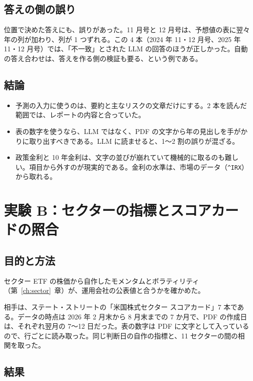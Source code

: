 \documentclass[xelatex,ja=standard,jafont=hiragino-pron,a4paper,10pt]{bxjsreport}
\newcommand{\code}[1]{\texttt{#1}}
\newcommand{\chapref}[1]{第~\ref{#1}~章}
\begin{document}
\section{答えの側の誤り}

位置で決めた答えにも、誤りがあった。11 月号と 12 月号は、予想値の表に翌々年の列が加わり、列が 1 つずれる。この 4 本（2024 年 11・12 月号、2025 年 11・12 月号）では、「不一致」とされた LLM の回答のほうが正しかった。自動の答え合わせは、答えを作る側の検証も要る、という例である。

\section{結論}

\begin{itemize}
\item 予測の入力に使うのは、要約と主なリスクの文章だけにする。2 本を読んだ範囲では、レポートの内容と合っていた。
\item 表の数字を使うなら、LLM ではなく、PDF の文字から年の見出しを手がかりに取り出すべきである。LLM に読ませると、1〜2 割の誤りが混ざる。
\item 政策金利と 10 年金利は、文字の並びが崩れていて機械的に取るのも難しい。項目から外すのが現実的である。金利の水準は、市場のデータ（\code{\textasciicircum IRX}）から取れる。
\end{itemize}

\chapter{実験 B：セクターの指標とスコアカードの照合}\label{ch:expB}

\section{目的と方法}

セクター ETF の株価から自作したモメンタムとボラティリティ（\chapref{ch:sector}）が、運用会社の公表値と合うかを確かめた。

相手は、ステート・ストリートの「米国株式セクター スコアカード」7 本である。データの時点は 2026 年 2 月末から 8 月末までの 7 か月で、PDF の作成日は、それぞれ翌月の 7〜12 日だった。表の数字は PDF に文字として入っているので、行ごとに読み取った。同じ判断日の自作の指標と、11 セクターの間の相関を取った。

\section{結果}
\end{document}
